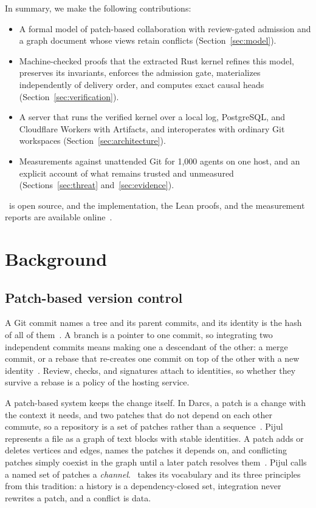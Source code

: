In summary, we make the following contributions:
\begin{itemize}
\item A formal model of patch-based collaboration with review-gated admission and a graph document whose views retain conflicts (Section~\ref{sec:model}).
\item Machine-checked proofs that the extracted Rust kernel refines this model, preserves its invariants, enforces the admission gate, materializes independently of delivery order, and computes exact causal heads (Section~\ref{sec:verification}).
\item A server that runs the verified kernel over a local log, PostgreSQL, and Cloudflare Workers with Artifacts, and interoperates with ordinary Git workspaces (Section~\ref{sec:architecture}).
\item Measurements against unattended Git for 1,000 agents on one host, and an explicit account of what remains trusted and unmeasured (Sections~\ref{sec:threat} and~\ref{sec:evidence}).
\end{itemize}
\sys\ is open source, and the implementation, the Lean proofs, and the measurement reports are available online~\cite{o5s}.

\section{Background}\label{sec:background}
\subsection{Patch-based version control}
A Git commit names a tree and its parent commits, and its identity is the hash of all of them~\cite{gitobjects}. A branch is a pointer to one commit, so integrating two independent commits means making one a descendant of the other: a merge commit, or a rebase that re-creates one commit on top of the other with a new identity~\cite{gitrebase}. Review, checks, and signatures attach to identities, so whether they survive a rebase is a policy of the hosting service.

A patch-based system keeps the change itself. In Darcs, a patch is a change with the context it needs, and two patches that do not depend on each other commute, so a repository is a set of patches rather than a sequence~\cite{darcs}. Pijul represents a file as a graph of text blocks with stable identities. A patch adds or deletes vertices and edges, names the patches it depends on, and conflicting patches simply coexist in the graph until a later patch resolves them~\cite{pijul}. Pijul calls a named set of patches a \emph{channel}. \sys\ takes its vocabulary and its three principles from this tradition: a history is a dependency-closed set, integration never rewrites a patch, and a conflict is data.

